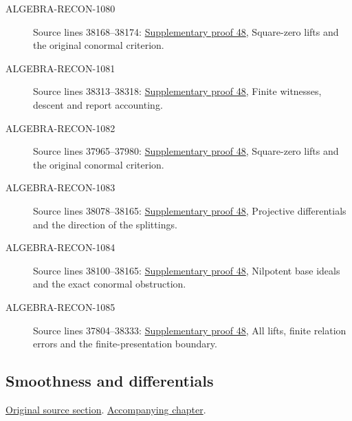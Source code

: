 \begin{description}
\item[ALGEBRA-RECON-1080] Source lines 38168--38174: \hyperlink{algebra_formal_smooth_notes_20260928}{Supplementary proof 48}, Square-zero lifts and the original conormal criterion.
\item[ALGEBRA-RECON-1081] Source lines 38313--38318: \hyperlink{algebra_formal_smooth_notes_20260928}{Supplementary proof 48}, Finite witnesses, descent and report accounting.
\item[ALGEBRA-RECON-1082] Source lines 37965--37980: \hyperlink{algebra_formal_smooth_notes_20260928}{Supplementary proof 48}, Square-zero lifts and the original conormal criterion.
\item[ALGEBRA-RECON-1083] Source lines 38078--38165: \hyperlink{algebra_formal_smooth_notes_20260928}{Supplementary proof 48}, Projective differentials and the direction of the splittings.
\item[ALGEBRA-RECON-1084] Source lines 38100--38165: \hyperlink{algebra_formal_smooth_notes_20260928}{Supplementary proof 48}, Nilpotent base ideals and the exact conormal obstruction.
\item[ALGEBRA-RECON-1085] Source lines 37804--38333: \hyperlink{algebra_formal_smooth_notes_20260928}{Supplementary proof 48}, All lifts, finite relation errors and the finite-presentation boundary.
\end{description}

\subsection{Smoothness and differentials}
\hypertarget{algebra-source-section-smooth-differential}{}
\noindent\href{https://github.com/stacks/stacks-project/blob/a04446e57ec1fbc252a871afcec7752fb2807b14/algebra.tex\#L38340}{Original source section}. \href{algebra.pdf\#nameddest=section-smooth-differential}{Accompanying chapter}.

